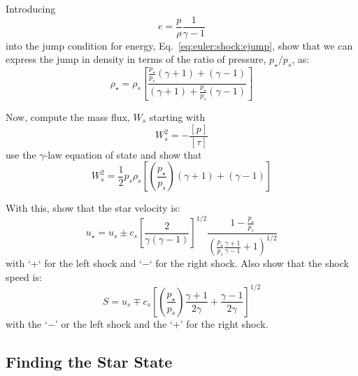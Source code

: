 \begin{exercise}
{
Introducing 
\begin{equation}
e = \frac{p}{\rho} \frac{1}{\gamma -1}
\end{equation}
into the jump condition for energy, Eq.~\ref{eq:euler:shock:ejump},
show that we can express the jump in density in terms of the
ratio of pressure, $p_\star/p_s$, as:
\begin{equation}
\rho_\star = \rho_s \left [ \frac{ \frac{p_\star}{p_s} (\gamma + 1) + (\gamma - 1)}
   {(\gamma + 1) + \frac{p_\star}{p_s} (\gamma -1)} \right ]
\end{equation}
}

Now, compute the mass flux, $W_s$ starting with
\begin{equation}
W_s^2 = -\frac{[p]}{[\tau]}
\end{equation}
use the $\gamma$-law equation of state and show that
\begin{equation}
W_s^2 = \frac{1}{2} p_s \rho_s \left [ \left(\frac{p_\star}{p_s}\right) (\gamma + 1) + (\gamma -1) \right ]
\end{equation}

With this, show that the star velocity is:
\begin{equation}
u_\star = u_s \pm c_s \left [\frac{2}{\gamma(\gamma - 1)}\right]^{1/2} \frac{1 - \frac{p_\star}{p_s}}{\left ( \frac{p_\star}{p_s} \frac{\gamma + 1}{\gamma - 1} + 1\right)^{1/2}}
\end{equation}
with `+` for the left shock and `$-$` for the right shock.
Also show that the shock speed is:
\begin{equation}
S = u_s \mp c_s \left [ \left ( \frac{p_\star}{p_s} \right ) \frac{\gamma+1}{2\gamma} + \frac{\gamma-1}{2\gamma} \right ]^{1/2}
\end{equation}
with the `$-$' or the left shock and the `+' for the right shock.
\end{exercise}
  
\subsection{Finding the Star State}

